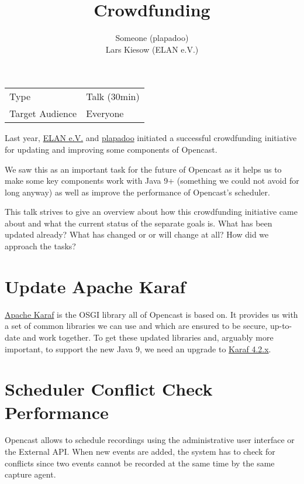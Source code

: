 \documentclass[a4paper]{article}
\title{Crowdfunding}
\author{
	Someone (plapadoo) \\
	Lars Kiesow (ELAN e.V.)
}
\begin{document}
\maketitle

\begin{center}
\begin{tabular}{ll}
\toprule
	Type            & Talk (30min) \\
	Target Audience & Everyone \\
\bottomrule
\end{tabular}
\end{center}

\vspace{1em}

Last year, \href{https://elan-ev.de}{ELAN e.V.} and
\href{https://plapadoo.com}{plapadoo} initiated a successful crowdfunding
initiative for updating and improving some components of Opencast.

We saw this as an important task for the future of Opencast as it helps us to
make some key components work with Java 9+ (something we could not avoid for
long anyway) as well as improve the performance of Opencast's scheduler.

This talk strives to give an overview about how this crowdfunding initiative
came about and what the current status of the separate goals is. What has been
updated already? What has changed or or will change at all? How did we approach
the tasks?


\section*{Update Apache Karaf}

\href{https://karaf.apache.org/}{Apache Karaf} is the OSGI library all of
Opencast is based on. It provides us with a set of common libraries we can use
and which are ensured to be secure, up-to-date and work together. To get these
updated libraries and, arguably more important, to support the new Java 9, we
need an upgrade to \href{https://karaf.apache.org/download.html}{Karaf 4.2.x}.


\section*{Scheduler Conflict Check Performance}

Opencast allows to schedule recordings using the administrative user
interface or the External API. When new events are added, the system
has to check for conflicts since two events cannot be recorded at the
same time by the same capture agent.
\end{document}
